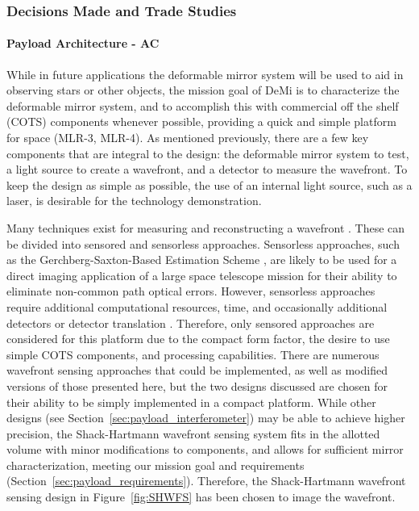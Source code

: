 \documentclass[12pt]{article}
\begin{document}
			\subsubsection{Decisions Made and Trade Studies}

\paragraph{Payload Architecture - AC}

While in future applications the deformable mirror system will be used to aid
in observing stars or other objects, the mission goal of DeMi is to characterize the deformable 
mirror system, and to accomplish this with commercial off the shelf (COTS) components
whenever possible, providing a quick and simple platform for space (MLR-3, MLR-4).
As mentioned previously, there are a few key components that are integral to the design: the 
deformable mirror system to test, a light source to create a wavefront, and a detector to measure the wavefront.
To keep the design as simple as possible, the use of an internal light source, such as a laser, is  desirable for the technology demonstration. 

Many techniques exist for measuring and reconstructing a wavefront \cite{FGadaptiveoptics}.  These can be divided into sensored and sensorless approaches.
Sensorless approaches, such as the Gerchberg-Saxton-Based Estimation Scheme \cite{gerchberg}, are likely to be used for a direct imaging application of a large space telescope mission for their ability to eliminate non-common path optical errors.  However, sensorless approaches require additional computational resources, time, and occasionally additional detectors or detector translation \cite{cahoy2013}.  
Therefore, only sensored
approaches are considered for this platform due to the compact form
factor, the desire to use simple COTS components, and processing capabilities. There are numerous wavefront
sensing approaches that could be implemented, as well as
modified versions of those presented here, but the two designs discussed are chosen for their ability to be simply implemented in a compact platform.
While other designs (see Section~\ref{sec:payload_interferometer}) may be able to achieve higher precision, the Shack-Hartmann wavefront sensing system fits in the allotted volume with minor modifications to components, and allows for sufficient mirror characterization, meeting our mission goal and requirements (Section~\ref{sec:payload_requirements}). Therefore, the Shack-Hartmann wavefront sensing design in Figure~\ref{fig:SHWFS} has been chosen to image the wavefront.
\end{document}
